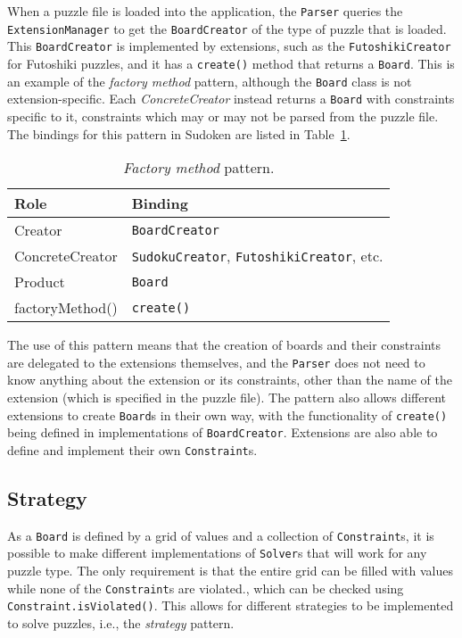 \documentclass[a4paper, 11pt]{article}
\begin{document}
When a puzzle file is loaded into the application, the \texttt{Parser} queries the \texttt{ExtensionManager} to get the \texttt{BoardCreator} of the type of puzzle that is loaded. This \texttt{BoardCreator} is implemented by extensions, such as the \texttt{FutoshikiCreator} for Futoshiki puzzles, and it has a \texttt{create()} method that returns a \texttt{Board}. This is an example of the \textit{factory method} pattern, although the \texttt{Board} class is not extension-specific. Each \textit{ConcreteCreator} instead returns a \texttt{Board} with constraints specific to it, constraints which may or may not be parsed from the puzzle file. The bindings for this pattern in Sudoken are listed in Table~\ref{table:factory}.

\begin{table}[h!]
\centering
\begin{tabular}{l l}
\textbf{Role}   & \textbf{Binding} \\ \hline
Creator         & \texttt{BoardCreator} \\
ConcreteCreator & \texttt{SudokuCreator}, \texttt{FutoshikiCreator}, etc. \\
Product         & \texttt{Board} \\
factoryMethod() & \texttt{create()} \\
\end{tabular}
\caption{\textit{Factory method} pattern.}
\label{table:factory}
\end{table}

The use of this pattern means that the creation of boards and their constraints are delegated to the extensions themselves, and the \texttt{Parser} does not need to know anything about the extension or its constraints, other than the name of the extension (which is specified in the puzzle file). The pattern also allows different extensions to create \texttt{Board}s in their own way, with the functionality of \texttt{create()} being defined in implementations of \texttt{BoardCreator}. Extensions are also able to define and implement their own \texttt{Constraint}s.

\subsection{Strategy}

As a \texttt{Board} is defined by a grid of values and a collection of \texttt{Constraint}s, it is possible to make different implementations of \texttt{Solver}s that will work for any puzzle type. The only requirement is that the entire grid can be filled with values while none of the \texttt{Constraint}s are violated., which can be checked using \texttt{Constraint.isViolated()}. This allows for different strategies to be implemented to solve puzzles, i.e., the \textit{strategy} pattern.
\end{document}
